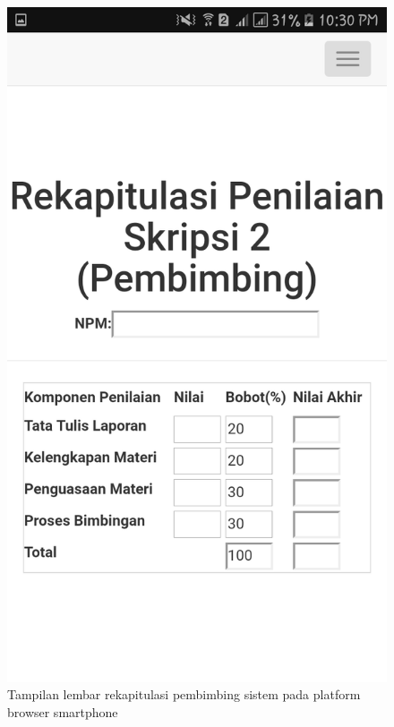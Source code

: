 \begin{figure}[H]
	\centering
	\includegraphics[scale=0.2]{Gambar/hp_pembimbing}
	\caption{Tampilan lembar rekapitulasi pembimbing sistem pada platform browser smartphone}
	\label{fig:hp_pembimbing}
\end{figure}

